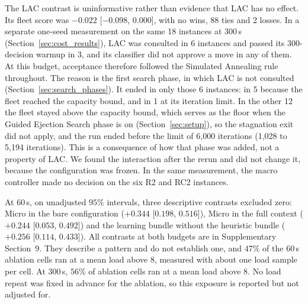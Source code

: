 \documentclass{ieeeaccess}
\begin{document}
The LAC contrast is uninformative rather than evidence that LAC has no effect. Its fleet score was $-0.022$ [$-0.098$, $0.000$], with no wins, 88 ties and 2 losses. In a separate one-seed measurement on the same 18 instances at 300\,s (Section~\ref{sec:cost_results}), LAC was consulted in 6 instances and passed its 300-decision warmup in 3, and its classifier did not approve a move in any of them. At this budget, acceptance therefore followed the Simulated Annealing rule throughout. The reason is the first search phase, in which LAC is not consulted (Section~\ref{sec:search_phases}). It ended in only those 6 instances: in 5 because the fleet reached the capacity bound, and in 1 at its iteration limit. In the other 12 the fleet stayed above the capacity bound, which serves as the floor when the Guided Ejection Search phase is on (Section~\ref{sec:setup}), so the stagnation exit did not apply, and the run ended before the limit of 6,000 iterations (1,028 to 5,194 iterations). This is a consequence of how that phase was added, not a property of LAC. We found the interaction after the rerun and did not change it, because the configuration was frozen. In the same measurement, the macro controller made no decision on the six R2 and RC2 instances.

At 60\,s, on unadjusted $95\%$ intervals, three descriptive contrasts excluded zero: Micro in the bare configuration ($+0.344$ [$0.198$, $0.516$]), Micro in the full context ($+0.244$ [$0.053$, $0.492$]) and the learning bundle without the heuristic bundle ($+0.256$ [$0.114$, $0.433$]). All contrasts at both budgets are in Supplementary Section~9. They describe a pattern and do not establish one, and $47\%$ of the 60\,s ablation cells ran at a mean load above 8, measured with about one load sample per cell. At 300\,s, $56\%$ of ablation cells ran at a mean load above 8. No load repeat was fixed in advance for the ablation, so this exposure is reported but not adjusted for.
\end{document}
